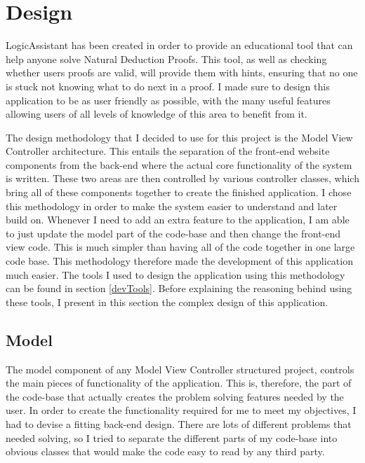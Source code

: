 \section{Design \label{design}}

LogicAssistant has been created in order to provide an educational tool that can help anyone solve Natural Deduction Proofs. This tool, as well as checking whether users proofs are valid, will provide them with hints, ensuring that no one is stuck not knowing what to do next in a proof. I made sure to design this application to be as user friendly as possible, with the many useful features allowing users of all levels of knowledge of this area to benefit from it. 

The design methodology that I decided to use for this project is the Model View Controller architecture. This entails the separation of the front-end website components from the back-end where the actual core functionality of the system is written. These two areas are then controlled by various controller classes, which bring all of these components together to create the finished application. I chose this methodology in order to make the system easier to understand and later build on. Whenever I need to add an extra feature to the application, I am able to just update the model part of the code-base and then change the front-end view code. This is much simpler than having all of the code together in one large code base. This methodology therefore made the development of this application much easier. The tools I used to design the application using this methodology can be found in section \ref{devTools}. Before explaining the reasoning behind using these tools, I present in this section the complex design of this application.


\subsection{Model}
The model component of any Model View Controller structured project, controls the main pieces of functionality of the application. This is, therefore, the part of the code-base that actually creates the problem solving features needed by the user. In order to create the functionality required for me to meet my objectives, I had to devise a fitting back-end design. There are lots of different problems that needed solving, so I tried to separate the different parts of my code-base into obvious classes that would make the code easy to read by any third party.

